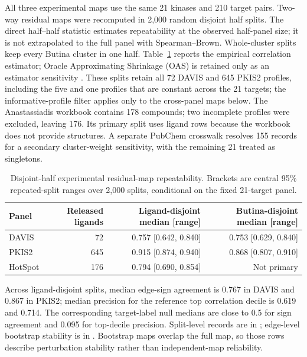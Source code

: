 \documentclass[11pt]{article}
\begin{document}
All three experimental maps use the same 21 kinases and 210 target pairs. Two-way
residual maps were recomputed in 2,000 random disjoint half splits. The direct
half--half statistic estimates repeatability at the observed half-panel size;
it is not extrapolated to the full panel with Spearman--Brown. Whole-cluster
splits keep every Butina cluster in one half. Table~\ref{tab:s5reliability}
reports the empirical correlation estimator; Oracle Approximating Shrinkage
(OAS) is retained only as an estimator sensitivity \cite{chen2010}. These
splits retain all 72 DAVIS and 645 PKIS2 profiles, including the five and one
profiles that are constant across the 21 targets; the informative-profile
filter applies only to the cross-panel maps below. The Anastassiadis workbook
contains 178 compounds; two incomplete profiles were excluded, leaving 176.
Its primary split uses ligand rows because the workbook does not provide
structures. A separate PubChem crosswalk resolves 155 records for a secondary
cluster-weight sensitivity, with the remaining 21 treated as singletons.

\begin{table}[htbp]
\centering
\caption{Disjoint-half experimental residual-map repeatability. Brackets are
central 95\% repeated-split ranges over 2,000 splits, conditional on the fixed
21-target panel.}
\label{tab:s5reliability}
\small
\begin{tabular}{lrrr}
\toprule
Panel & Released ligands & Ligand-disjoint median [range] &
Butina-disjoint median [range] \\
\midrule
DAVIS & 72 & 0.757 [0.642, 0.840] & 0.753 [0.629, 0.840] \\
PKIS2 & 645 & 0.915 [0.874, 0.940] & 0.868 [0.807, 0.910] \\
HotSpot & 176 & 0.794 [0.690, 0.854] & Not primary \\
\bottomrule
\end{tabular}
\end{table}

Across ligand-disjoint splits, median edge-sign agreement is 0.767 in DAVIS
and 0.867 in PKIS2; median precision for the reference top correlation decile
is 0.619 and 0.714. The corresponding target-label null medians are close to
0.5 for sign agreement and 0.095 for top-decile precision. Split-level records
are in ;
edge-level bootstrap stability is in
. Bootstrap maps
overlap the full map, so those rows describe perturbation stability rather than
independent-map reliability.
\end{document}
